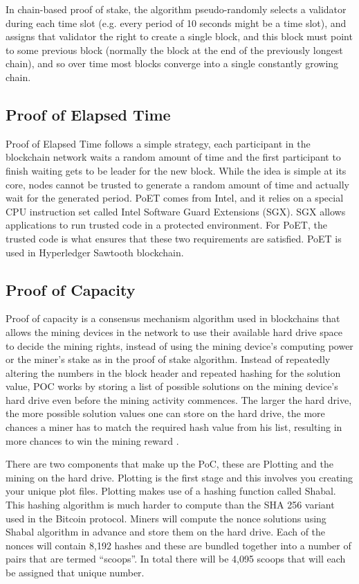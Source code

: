 In chain-based proof of stake, the algorithm pseudo-randomly selects a validator during each time slot (e.g. every period of 10 seconds might be a time slot), and assigns that validator the right to create a single block, and this block must point to some previous block (normally the block at the end of the previously longest chain), and so over time most blocks converge into a single constantly growing chain.\cite{pos}

\subsection{Proof of Elapsed Time }

Proof of Elapsed Time follows a simple strategy, each participant in the blockchain network waits a random amount of time and the first participant to finish waiting gets to be leader for the new block. While the idea is simple at its core, nodes cannot be trusted to generate a random amount of time and actually wait for the generated period. PoET comes from Intel, and it relies on a special CPU instruction set called Intel Software Guard Extensions (SGX). SGX allows applications to run trusted code in a protected environment. For PoET, the trusted code is what ensures that these two requirements are satisfied. PoET is used in Hyperledger Sawtooth blockchain. \cite{poet}

\subsection{Proof of Capacity}

Proof of capacity is a consensus mechanism algorithm used in blockchains that allows the mining devices in the network to use their available hard drive space to decide the mining rights, instead of using the mining device’s computing power or the miner’s stake as in the proof of stake algorithm. Instead of repeatedly altering the numbers in the block header and repeated hashing for the solution value, POC works by storing a list of possible solutions on the mining device’s hard drive even before the mining activity commences. The larger the hard drive, the more possible solution values one can store on the hard drive, the more chances a miner has to match the required hash value from his list, resulting in more chances to win the mining reward \cite{pot1}. 

There are two components that make up the PoC, these are Plotting and the mining on the hard drive. Plotting is the first stage and this involves you creating your unique plot files.
Plotting makes use of a hashing function called Shabal. This hashing algorithm is much harder to compute than the SHA 256 variant used in the Bitcoin protocol. Miners will compute the nonce solutions using Shabal algorithm in advance and store them on the hard drive.
Each of the nonces will contain 8,192 hashes and these are bundled together into a number of pairs that are termed “scoops”. In total there will be 4,095 scoops that will each be assigned that unique number.

